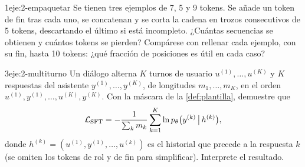\begin{ejercicio}{1}{eje:2-empaquetar}
Se tienen tres ejemplos de 7, 5 y 9 tokens. Se añade un token de fin tras cada uno, se concatenan y se corta la cadena en trozos consecutivos de 5 tokens, descartando el último si está incompleto. ¿Cuántas secuencias se obtienen y cuántos tokens se pierden? Compárese con rellenar cada ejemplo, con su fin, hasta 10 tokens: ¿qué fracción de posiciones es útil en cada caso?
\end{ejercicio}

\begin{ejercicio}{3}{eje:2-multiturno}
Un diálogo alterna $K$ turnos de usuario $u^{(1)},\dots,u^{(K)}$ y $K$ respuestas del asistente $y^{(1)},\dots,y^{(K)}$, de longitudes $m_1,\dots,m_K$, en el orden $u^{(1)},y^{(1)},\dots,u^{(K)},y^{(K)}$. Con la máscara de la \cref{def:plantilla}, demuestre que
\[
\mathcal{L}_{\mathrm{SFT}}=-\frac{1}{\sum_k m_k}\sum_{k=1}^{K}\ln p_\theta\bigl(y^{(k)}\,\big|\,h^{(k)}\bigr),
\]
donde $h^{(k)}=(u^{(1)},y^{(1)},\dots,u^{(k)})$ es el historial que precede a la respuesta $k$ (se omiten los tokens de rol y de fin para simplificar). Interprete el resultado.
\end{ejercicio}
